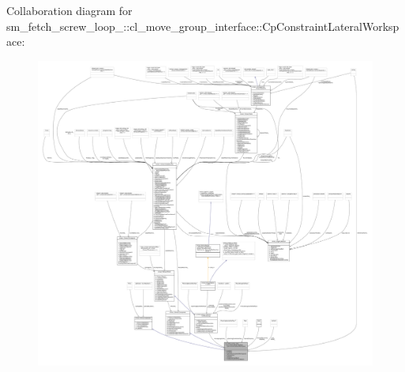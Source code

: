 Collaboration diagram for sm\+\_\+fetch\+\_\+screw\+\_\+loop\+\_\+:\+:cl\+\_\+move\+\_\+group\+\_\+interface\+:\+:Cp\+Constraint\+Lateral\+Workspace\+:
\nopagebreak
\begin{figure}[H]
\begin{center}
\leavevmode
\includegraphics[width=350pt]{classsm__fetch__screw__loop__1_1_1cl__move__group__interface_1_1CpConstraintLateralWorkspace__coll__graph}
\end{center}
\end{figure}
